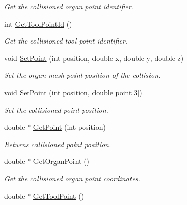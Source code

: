 \begin{DoxyCompactItemize}
\begin{DoxyCompactList}\small\item\em Get the collisioned organ point identifier. \item\end{DoxyCompactList}\item 
\hypertarget{classvtkContact_a687823eb62aa7a002e4b6aa5eb29c525}{
int \hyperlink{classvtkContact_a687823eb62aa7a002e4b6aa5eb29c525}{GetToolPointId} ()}
\label{classvtkContact_a687823eb62aa7a002e4b6aa5eb29c525}

\begin{DoxyCompactList}\small\item\em Get the collisioned tool point identifier. \item\end{DoxyCompactList}\item 
void \hyperlink{classvtkContact_adbd7a32c9ded4eef1c0f52e3aa222a30}{SetPoint} (int position, double x, double y, double z)
\begin{DoxyCompactList}\small\item\em Set the organ mesh point position of the collision. \item\end{DoxyCompactList}\item 
void \hyperlink{classvtkContact_a182b4b0d7769a3fde4a8236c4b462b85}{SetPoint} (int position, double point\mbox{[}3\mbox{]})
\begin{DoxyCompactList}\small\item\em Set the collisioned point position. \item\end{DoxyCompactList}\item 
double $\ast$ \hyperlink{classvtkContact_a03931eb9be6db9e78e5228d7bc37996f}{GetPoint} (int position)
\begin{DoxyCompactList}\small\item\em Returns collisioned point position. \item\end{DoxyCompactList}\item 
\hypertarget{classvtkContact_ab34adfc8b3aef556ee01e6f82174c936}{
double $\ast$ \hyperlink{classvtkContact_ab34adfc8b3aef556ee01e6f82174c936}{GetOrganPoint} ()}
\label{classvtkContact_ab34adfc8b3aef556ee01e6f82174c936}

\begin{DoxyCompactList}\small\item\em Get the collisioned organ point coordinates. \item\end{DoxyCompactList}\item 
\hypertarget{classvtkContact_a7a6259deea9301cfb78b2d4b4e8814da}{
double $\ast$ \hyperlink{classvtkContact_a7a6259deea9301cfb78b2d4b4e8814da}{GetToolPoint} ()}
\label{classvtkContact_a7a6259deea9301cfb78b2d4b4e8814da}


\end{DoxyCompactItemize}
